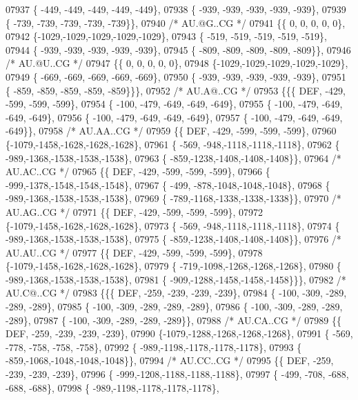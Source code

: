 \begin{DoxyCode}
07937 \{ -449, -449, -449, -449, -449\},
07938 \{ -939, -939, -939, -939, -939\},
07939 \{ -739, -739, -739, -739, -739\}\},
07940 \textcolor{comment}{/* AU.@G..CG */}
07941 \{\{    0,    0,    0,    0,    0\},
07942 \{-1029,-1029,-1029,-1029,-1029\},
07943 \{ -519, -519, -519, -519, -519\},
07944 \{ -939, -939, -939, -939, -939\},
07945 \{ -809, -809, -809, -809, -809\}\},
07946 \textcolor{comment}{/* AU.@U..CG */}
07947 \{\{    0,    0,    0,    0,    0\},
07948 \{-1029,-1029,-1029,-1029,-1029\},
07949 \{ -669, -669, -669, -669, -669\},
07950 \{ -939, -939, -939, -939, -939\},
07951 \{ -859, -859, -859, -859, -859\}\}\},
07952 \textcolor{comment}{/* AU.A@..CG */}
07953 \{\{\{  DEF, -429, -599, -599, -599\},
07954 \{ -100, -479, -649, -649, -649\},
07955 \{ -100, -479, -649, -649, -649\},
07956 \{ -100, -479, -649, -649, -649\},
07957 \{ -100, -479, -649, -649, -649\}\},
07958 \textcolor{comment}{/* AU.AA..CG */}
07959 \{\{  DEF, -429, -599, -599, -599\},
07960 \{-1079,-1458,-1628,-1628,-1628\},
07961 \{ -569, -948,-1118,-1118,-1118\},
07962 \{ -989,-1368,-1538,-1538,-1538\},
07963 \{ -859,-1238,-1408,-1408,-1408\}\},
07964 \textcolor{comment}{/* AU.AC..CG */}
07965 \{\{  DEF, -429, -599, -599, -599\},
07966 \{ -999,-1378,-1548,-1548,-1548\},
07967 \{ -499, -878,-1048,-1048,-1048\},
07968 \{ -989,-1368,-1538,-1538,-1538\},
07969 \{ -789,-1168,-1338,-1338,-1338\}\},
07970 \textcolor{comment}{/* AU.AG..CG */}
07971 \{\{  DEF, -429, -599, -599, -599\},
07972 \{-1079,-1458,-1628,-1628,-1628\},
07973 \{ -569, -948,-1118,-1118,-1118\},
07974 \{ -989,-1368,-1538,-1538,-1538\},
07975 \{ -859,-1238,-1408,-1408,-1408\}\},
07976 \textcolor{comment}{/* AU.AU..CG */}
07977 \{\{  DEF, -429, -599, -599, -599\},
07978 \{-1079,-1458,-1628,-1628,-1628\},
07979 \{ -719,-1098,-1268,-1268,-1268\},
07980 \{ -989,-1368,-1538,-1538,-1538\},
07981 \{ -909,-1288,-1458,-1458,-1458\}\}\},
07982 \textcolor{comment}{/* AU.C@..CG */}
07983 \{\{\{  DEF, -259, -239, -239, -239\},
07984 \{ -100, -309, -289, -289, -289\},
07985 \{ -100, -309, -289, -289, -289\},
07986 \{ -100, -309, -289, -289, -289\},
07987 \{ -100, -309, -289, -289, -289\}\},
07988 \textcolor{comment}{/* AU.CA..CG */}
07989 \{\{  DEF, -259, -239, -239, -239\},
07990 \{-1079,-1288,-1268,-1268,-1268\},
07991 \{ -569, -778, -758, -758, -758\},
07992 \{ -989,-1198,-1178,-1178,-1178\},
07993 \{ -859,-1068,-1048,-1048,-1048\}\},
07994 \textcolor{comment}{/* AU.CC..CG */}
07995 \{\{  DEF, -259, -239, -239, -239\},
07996 \{ -999,-1208,-1188,-1188,-1188\},
07997 \{ -499, -708, -688, -688, -688\},
07998 \{ -989,-1198,-1178,-1178,-1178\},

\end{DoxyCode}
